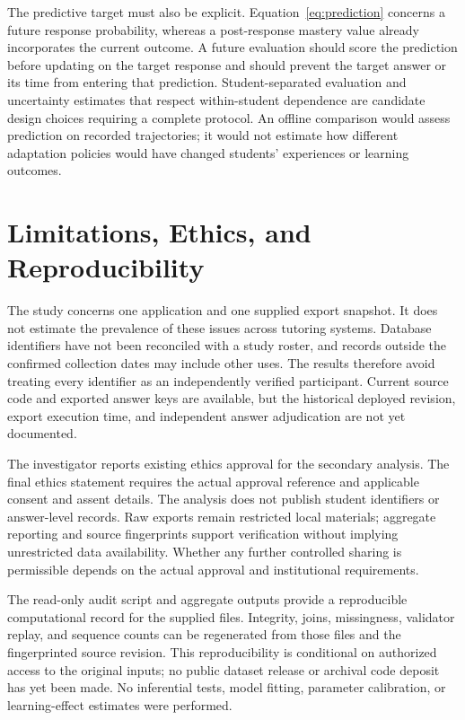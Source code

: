 \documentclass[conference]{IEEEtran}
\begin{document}
The predictive target must also be explicit. Equation~\ref{eq:prediction} concerns a future response probability, whereas a post-response mastery value already incorporates the current outcome. A future evaluation should score the prediction before updating on the target response and should prevent the target answer or its time from entering that prediction. Student-separated evaluation and uncertainty estimates that respect within-student dependence are candidate design choices requiring a complete protocol. An offline comparison would assess prediction on recorded trajectories; it would not estimate how different adaptation policies would have changed students' experiences or learning outcomes.

\section{Limitations, Ethics, and Reproducibility}
The study concerns one application and one supplied export snapshot. It does not estimate the prevalence of these issues across tutoring systems. Database identifiers have not been reconciled with a study roster, and records outside the confirmed collection dates may include other uses. The results therefore avoid treating every identifier as an independently verified participant. Current source code and exported answer keys are available, but the historical deployed revision, export execution time, and independent answer adjudication are not yet documented.

The investigator reports existing ethics approval for the secondary analysis. The final ethics statement requires the actual approval reference and applicable consent and assent details. The analysis does not publish student identifiers or answer-level records. Raw exports remain restricted local materials; aggregate reporting and source fingerprints support verification without implying unrestricted data availability. Whether any further controlled sharing is permissible depends on the actual approval and institutional requirements.

The read-only audit script and aggregate outputs provide a reproducible computational record for the supplied files. Integrity, joins, missingness, validator replay, and sequence counts can be regenerated from those files and the fingerprinted source revision. This reproducibility is conditional on authorized access to the original inputs; no public dataset release or archival code deposit has yet been made. No inferential tests, model fitting, parameter calibration, or learning-effect estimates were performed.
\end{document}
